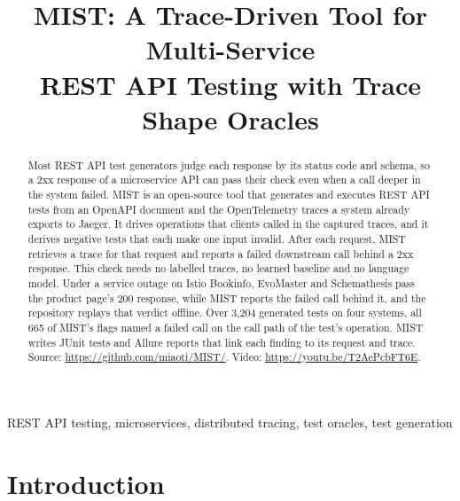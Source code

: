 \documentclass[10pt,conference]{IEEEtran}
\begin{document}
\title{MIST: A Trace-Driven Tool for Multi-Service\\REST API Testing with Trace Shape Oracles}

\author{%
}

\maketitle

\begin{abstract}
Most REST API test generators judge each response by its status code and schema, so a 2xx response of a microservice API can pass their check even when a call deeper in the system failed. MIST is an open-source tool that generates and executes REST API tests from an OpenAPI document and the OpenTelemetry traces a system already exports to Jaeger. It drives operations that clients called in the captured traces, and it derives negative tests that each make one input invalid. After each request, MIST retrieves a trace for that request and reports a failed downstream call behind a 2xx response. This check needs no labelled traces, no learned baseline and no language model. Under a service outage on Istio Bookinfo, EvoMaster and Schemathesis pass the product page's 200 response, while MIST reports the failed call behind it, and the repository replays that verdict offline. Over 3,204 generated tests on four systems, all 665 of MIST's flags named a failed call on the call path of the test's operation. MIST writes JUnit tests and Allure reports that link each finding to its request and trace. Source: \url{https://github.com/miaoti/MIST/}. Video: \url{https://youtu.be/T2AePcbFT6E}.
\end{abstract}

\begin{IEEEkeywords}
REST API testing, microservices, distributed tracing, test oracles, test generation
\end{IEEEkeywords}

\section{Introduction}\label{sec:intro}
\end{document}
